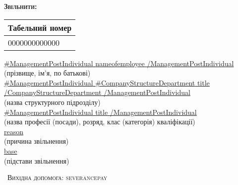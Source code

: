 {{{ \textbf{\textsc{Звільнити: \changedate{\webdate} }}

\hfill\begin{minipage}{0.27\textwidth}
\medskip
\begin{tabularx}{\textwidth}{ | X |  }
\hline
Табельний номер \rule{0pt}{3ex} \\ [1ex] \hline
0000000000000  \rule{0pt}{3ex} \\ [1ex] \hline
\end{tabularx}
\end{minipage}


\begin{center}
{\large {  \underline{ {{#ManagementPostIndividual}} {{nameofemployee}} {{/ManagementPostIndividual}}  } }}  \\
\vspace{0.5mm}
{\small{  (прізвище, ім'я, по батькові) }} \\
\vspace{3mm}
{\large{  \underline{  {{#ManagementPostIndividual}} {{#CompanyStructureDepartment}} {{title}}  {{/CompanyStructureDepartment}}  {{/ManagementPostIndividual}}   } }} \\
\vspace{0.5mm}
{\small{ (назва структурного підрозділу)    }}  \\
\vspace{3mm}
{\large{ \underline{  {{#ManagementPostIndividual}} {{title}} {{/ManagementPostIndividual}}    } }}  \\
\vspace{0.5mm}
{\small{(назва професії (посади), розряд, клас (категорія) кваліфікації) }}  \\
\vspace{3mm}
{\large {  \underline{ {{reason}} }  }} \\
\vspace{0.5mm}
{\small{ (причина звільнення)  }} \\
\vspace{3mm}
{\large {   \underline{ {{base}} } }} \\
\vspace{0.5mm}
{\small{ (підстави звільнення) }} \\
\end{center}

\vspace{5mm}

{\textsc{\Square\ Вихідна допомога: {{severancepay}} } \\

\vspace{1cm}

}}}}
